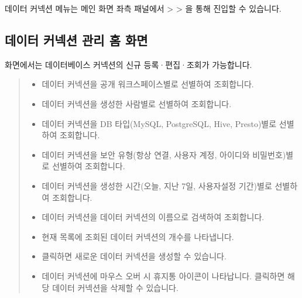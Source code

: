 \documentclass[letterpaper,10pt,english]{sphinxmanual}
\begin{document}
데이터 커넥션 메뉴는 메인 화면 좌측 패널에서  \textgreater{}  \textgreater{} 을 통해 진입할 수 있습니다.
\begin{quote}

\begin{figure}[H]
\centering

\noindent{}
\end{figure}
\end{quote}


\subsection{데이터 커넥션 관리 홈 화면}
\label{\detokenize{discovery/part02/data_connection:id2}}
 화면에서는 데이터베이스 커넥션의 신규 등록·편집·조회가 가능합니다.
\begin{quote}

\begin{figure}[H]
\centering

\noindent{}
\end{figure}
\begin{itemize}
\item {} 
 데이터 커넥션을 공개 워크스페이스별로 선별하여 조회합니다.

\item {} 
 데이터 커넥션을 생성한 사람별로 선별하여 조회합니다.

\item {} 
 데이터 커넥션을 DB 타입(MySQL, PostgreSQL, Hive, Presto)별로 선별하여 조회합니다.

\item {} 
 데이터 커넥션을 보안 유형(항상 연결, 사용자 계정, 아이디와 비밀번호)별로 선별하여 조회합니다.

\item {} 
 데이터 커넥션을 생성한 시간(오늘, 지난 7일, 사용자설정 기간)별로 선별하여 조회합니다.

\item {} 
 데이터 커넥션을 데이터 커넥션의 이름으로 검색하여 조회합니다.

\item {} 
 현재 목록에 조회된 데이터 커넥션의 개수를 나타냅니다.

\item {} 
 클릭하면 새로운 데이터 커넥션을 생성할 수 있습니다.

\item {} 
 데이터 커넥션에 마우스 오버 시 휴지통 아이콘이 나타납니다. 클릭하면 해당 데이터 커넥션을 삭제할 수 있습니다.

\end{itemize}
\end{quote}
\end{document}
